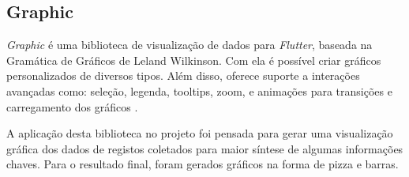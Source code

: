 \subsection{Graphic}

\textit{Graphic} é uma biblioteca de visualização de dados para \textit{Flutter}, 
baseada 
na Gramática de Gráficos de Leland Wilkinson. Com ela é possível criar gráficos 
personalizados de diversos tipos. Além disso, oferece suporte 
a interações avançadas como: seleção, legenda, tooltips, zoom, e animações 
para transições e carregamento dos gráficos \cite{graphic_flutter}.

A aplicação desta biblioteca no projeto foi pensada para gerar uma 
visualização gráfica dos dados de registos coletados para maior síntese de
algumas informações chaves.
Para o resultado final, foram gerados gráficos na forma de pizza e barras.
